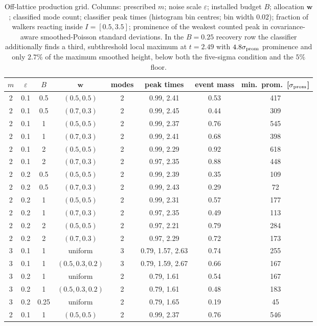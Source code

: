 \documentclass[aps,physrev,onecolumn,amsmath,amssymb,longbibliography]{revtex4-2}
\begin{document}
\begin{table}[t]
\caption{Off-lattice production grid.  Columns: prescribed \(m\); noise
scale \(\varepsilon\); installed budget \(B\); allocation \(\bm w\);
classified mode count; classifier peak times (histogram bin centres; bin
width \(0.02\)); fraction of walkers
reacting inside \(I=[0.5,3.5]\); prominence of the weakest counted peak in
covariance-aware smoothed-Poisson standard deviations.  In the \(B=0.25\)
recovery row the
classifier additionally finds a third, subthreshold local maximum at
\(t=2.49\) with \(4.8\sigma_{\rm prom}\) prominence and only \(2.7\%\) of the maximum
smoothed height, below both the five-sigma condition and the \(5\%\)
floor.
\label{tab:supp-production}}
\begin{ruledtabular}
\begin{tabular}{cccccccc}
\(m\) & \(\varepsilon\) & \(B\) & \(\bm w\) & modes & peak times &
event mass & min.\ prom.\ [\(\sigma_{\rm prom}\)]\\
\hline
2 & 0.1 & 0.5 & \((0.5,0.5)\) & 2 & 0.99, 2.41 & 0.53 & 417 \\
2 & 0.1 & 0.5 & \((0.7,0.3)\) & 2 & 0.99, 2.45 & 0.44 & 309 \\
2 & 0.1 & 1 & \((0.5,0.5)\) & 2 & 0.99, 2.37 & 0.76 & 545 \\
2 & 0.1 & 1 & \((0.7,0.3)\) & 2 & 0.99, 2.41 & 0.68 & 398 \\
2 & 0.1 & 2 & \((0.5,0.5)\) & 2 & 0.99, 2.29 & 0.92 & 618 \\
2 & 0.1 & 2 & \((0.7,0.3)\) & 2 & 0.97, 2.35 & 0.88 & 448 \\
2 & 0.2 & 0.5 & \((0.5,0.5)\) & 2 & 0.99, 2.39 & 0.35 & 109 \\
2 & 0.2 & 0.5 & \((0.7,0.3)\) & 2 & 0.99, 2.43 & 0.29 & 72 \\
2 & 0.2 & 1 & \((0.5,0.5)\) & 2 & 0.99, 2.31 & 0.57 & 177 \\
2 & 0.2 & 1 & \((0.7,0.3)\) & 2 & 0.97, 2.35 & 0.49 & 113 \\
2 & 0.2 & 2 & \((0.5,0.5)\) & 2 & 0.97, 2.21 & 0.79 & 284 \\
2 & 0.2 & 2 & \((0.7,0.3)\) & 2 & 0.97, 2.29 & 0.72 & 173 \\
3 & 0.1 & 1 & uniform & 3 & 0.79, 1.57, 2.63 & 0.74 & 255 \\
3 & 0.1 & 1 & \((0.5,0.3,0.2)\) & 3 & 0.79, 1.59, 2.67 & 0.66 & 167 \\
3 & 0.2 & 1 & uniform & 2 & 0.79, 1.61 & 0.54 & 167 \\
3 & 0.2 & 1 & \((0.5,0.3,0.2)\) & 2 & 0.79, 1.61 & 0.48 & 183 \\
3 & 0.2 & 0.25 & uniform & 2 & 0.79, 1.65 & 0.19 & 45 \\
2\footnotemark[1] & 0.1 & 1 & \((0.5,0.5)\) & 2 & 0.99, 2.37 & 0.76 & 546 \\
\end{tabular}
\end{ruledtabular}
\end{table}
\end{document}
